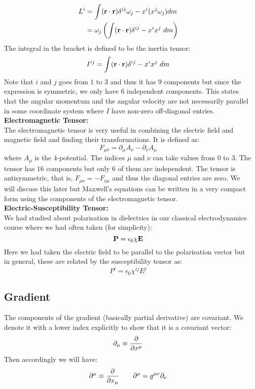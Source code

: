 \begin{align*}
    L^i &= \int (\veb{r}\cdot \veb{r})\tensor*{\delta}{^i^j}\omega_j - x^i(x^j\omega_j)dm\\
    &= \omega_j \brac{\int (\veb{r}\cdot \veb{r})\tensor*{\delta}{^i^j} - x^ix^j\ dm} 
\end{align*}
The integral in the bracket is defined to be the inertia tensor:
$$I^{ij} = \int (\veb{r}\cdot \veb{r})\tensor*{\delta}{^i^j} - x^ix^j \ dm$$
Note that $i$ and $j$ goes from $1$ to $3$ and thus it has $9$ components but since the expression is symmetric, we only have $6$ independent components. This states that the angular momentum and the angular velocity are not necessarily parallel in some coordinate system where $I$ have non-zero off-diagonal entries.\\[0.3cm]
\textbf{Electromagnetic Tensor:}\\[0.3cm]
The electromagnetic tensor is very useful in combining the electric field and magnetic field and finding their transformations. It is defined as:
$$F_{\mu\nu} = \partial_\mu A_\nu - \partial_\nu A_\mu$$
where $A_\mu$ is the 4-potential. The indices $\mu$ and $\nu$ can take values from $0$ to $3$. The tensor has $16$ components but only $6$ of them are independent. The tensor is antisymmetric, that is, $F_{\mu\nu} = -F_{\nu\mu}$ and thus the diagonal entries are zero. We will discuss this later but Maxwell's equations can be written in a very compact form using the components of the electromagnetic tensor.\\[0.3cm]
\textbf{Electric-Susceptibility Tensor:}\\[0.3cm]
We had studied about polarisation in dielectrics in our classical electrodynamics course where we had often taken (for simplicity):
$$\boldsymbol{\mathbf{P}} = \epsilon_0\chi\boldsymbol{\mathbf{E}}$$
Here we had taken the electric field to be parallel to the polarisation vector but in general, these are related by the susceptibility tensor as:
$$P^i = \epsilon_0\chi^{ij}E^{j}$$
\subsection{Gradient}
The components of the gradient (basically partial derivative) are covariant. We denote it with a lower index explicitly to show that it is a covariant vector:
$$\partial_\mu \equiv \pdv{x^\mu}$$
Then accordingly we will have:
$$\partial^\mu \equiv \pdv{x_\mu} \quad \quad \partial^\mu = g^{\mu\nu}\partial_\nu$$
